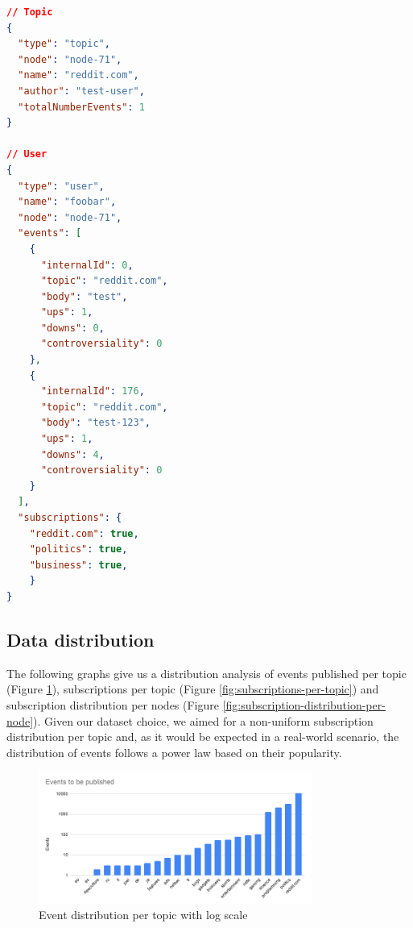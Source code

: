 \begin{lstlisting}[language=JSON, float, caption={Data example to be used in testbed},label={dataset-output}]
// Topic
{
  "type": "topic",
  "node": "node-71",
  "name": "reddit.com",
  "author": "test-user",
  "totalNumberEvents": 1
}

// User
{
  "type": "user",
  "name": "foobar",
  "node": "node-71",
  "events": [
    {
      "internalId": 0,
      "topic": "reddit.com",
      "body": "test",
      "ups": 1,
      "downs": 0,
      "controversiality": 0
    },
    {
      "internalId": 176,
      "topic": "reddit.com",
      "body": "test-123",
      "ups": 1,
      "downs": 4,
      "controversiality": 0
    }
  ],
  "subscriptions": {
  	"reddit.com": true,
  	"politics": true,
  	"business": true,
	}
}
\end{lstlisting}

\subsection{Data distribution}\label{subsec:data-distribution}

The following graphs give us a distribution analysis of events published per
topic (Figure \ref{fig:events-to-be-publisher-per-topic}), subscriptions per
topic (Figure \ref{fig:subscriptions-per-topic}) and subscription distribution
per nodes (Figure \ref{fig:subscription-distribution-per-node}). Given our
dataset choice, we aimed for a non-uniform subscription distribution per topic
and, as it would be expected in a real-world scenario, the distribution of
events follows a power law based on their popularity. 

\begin{figure}[!htb]
  \centering
  \includegraphics[width=0.8\textwidth]{img/events-to-be-publisher-per-topic.png}
  \caption{Event distribution per topic with log scale}
  \label{fig:events-to-be-publisher-per-topic}
\end{figure}

